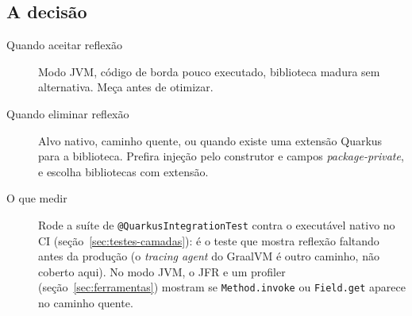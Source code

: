 \subsection*{A decisão}

\begin{description}
\item[Quando aceitar reflexão] Modo JVM, código de borda pouco
  executado, biblioteca madura sem alternativa. Meça antes de otimizar.
\item[Quando eliminar reflexão] Alvo nativo, caminho quente, ou quando
  existe uma extensão Quarkus para a biblioteca. Prefira injeção pelo
  construtor e campos \emph{package-private}, e escolha bibliotecas com
  extensão.
\item[O que medir] Rode a suíte de \texttt{@QuarkusIntegrationTest}
  contra o executável nativo no CI (seção~\ref{sec:testes-camadas}):
  é o teste que mostra reflexão faltando antes da produção (o
  \emph{tracing agent} do GraalVM é outro caminho, não coberto aqui). No modo JVM, o JFR e um
  profiler (seção~\ref{sec:ferramentas}) mostram se
  \texttt{Method.invoke} ou \texttt{Field.get} aparece no caminho quente.
\end{description}
